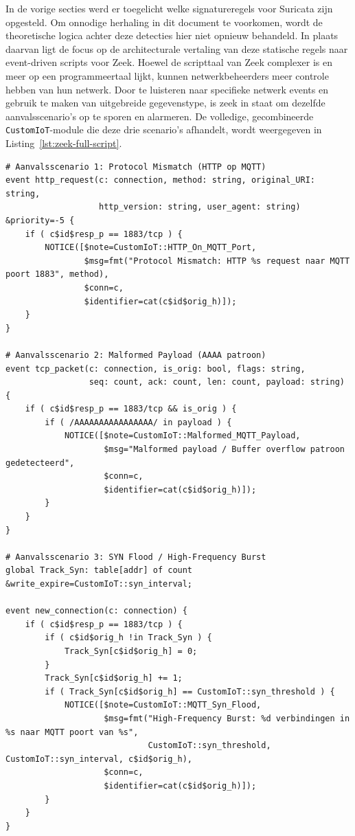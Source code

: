 In de vorige secties werd er toegelicht welke signatureregels voor Suricata zijn opgesteld. Om onnodige herhaling in dit document te voorkomen, wordt de theoretische logica achter deze detecties hier niet opnieuw behandeld. In plaats daarvan ligt de focus op de architecturale vertaling van deze statische regels naar event-driven scripts voor Zeek.
Hoewel de scripttaal van Zeek complexer is en meer op een programmeertaal lijkt, kunnen netwerkbeheerders meer controle hebben van hun netwerk. Door te luisteren naar specifieke netwerk events en gebruik te maken van uitgebreide gegevenstype, is zeek in staat om dezelfde aanvalsscenario’s op te sporen en alarmeren. De volledige, gecombineerde \texttt{CustomIoT}-module die deze drie scenario’s afhandelt, wordt weergegeven in Listing~\ref{lst:zeek-full-script}.


\begin{listing}[H]
\begin{verbatim}
# Aanvalsscenario 1: Protocol Mismatch (HTTP op MQTT)
event http_request(c: connection, method: string, original_URI: string,
                   http_version: string, user_agent: string) &priority=-5 {
    if ( c$id$resp_p == 1883/tcp ) {
        NOTICE([$note=CustomIoT::HTTP_On_MQTT_Port,
                $msg=fmt("Protocol Mismatch: HTTP %s request naar MQTT poort 1883", method),
                $conn=c,
                $identifier=cat(c$id$orig_h)]);
    }
}

# Aanvalsscenario 2: Malformed Payload (AAAA patroon)
event tcp_packet(c: connection, is_orig: bool, flags: string,
                 seq: count, ack: count, len: count, payload: string) {
    if ( c$id$resp_p == 1883/tcp && is_orig ) {
        if ( /AAAAAAAAAAAAAAAA/ in payload ) {
            NOTICE([$note=CustomIoT::Malformed_MQTT_Payload,
                    $msg="Malformed payload / Buffer overflow patroon gedetecteerd",
                    $conn=c,
                    $identifier=cat(c$id$orig_h)]);
        }
    }
}

# Aanvalsscenario 3: SYN Flood / High-Frequency Burst
global Track_Syn: table[addr] of count &write_expire=CustomIoT::syn_interval;

event new_connection(c: connection) {
    if ( c$id$resp_p == 1883/tcp ) {
        if ( c$id$orig_h !in Track_Syn ) {
            Track_Syn[c$id$orig_h] = 0;
        }
        Track_Syn[c$id$orig_h] += 1;
        if ( Track_Syn[c$id$orig_h] == CustomIoT::syn_threshold ) {
            NOTICE([$note=CustomIoT::MQTT_Syn_Flood,
                    $msg=fmt("High-Frequency Burst: %d verbindingen in %s naar MQTT poort van %s",
                             CustomIoT::syn_threshold, CustomIoT::syn_interval, c$id$orig_h),
                    $conn=c,
                    $identifier=cat(c$id$orig_h)]);
        }
    }
}
\end{verbatim}
\caption{Het volledige \texttt{CustomIoT.zeek} script ter implementatie van de drie voorafgedefinieerde aanvalsscenario's.}
\label{lst:zeek-full-script}
\end{listing}

